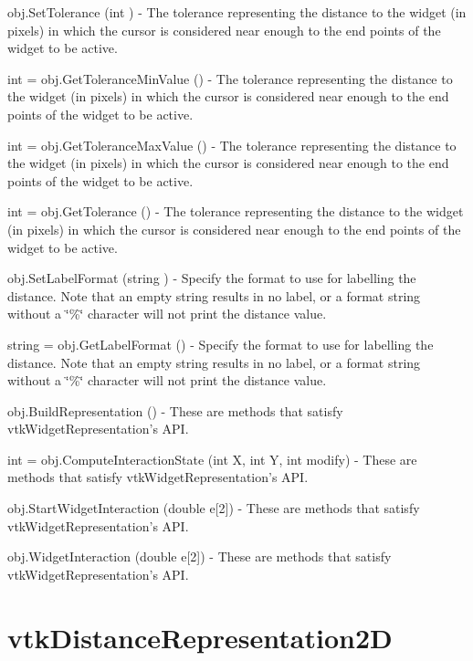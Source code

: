 \begin{DoxyItemize}
\item {\ttfamily obj.\-Set\-Tolerance (int )} -\/ The tolerance representing the distance to the widget (in pixels) in which the cursor is considered near enough to the end points of the widget to be active.  
\item {\ttfamily int = obj.\-Get\-Tolerance\-Min\-Value ()} -\/ The tolerance representing the distance to the widget (in pixels) in which the cursor is considered near enough to the end points of the widget to be active.  
\item {\ttfamily int = obj.\-Get\-Tolerance\-Max\-Value ()} -\/ The tolerance representing the distance to the widget (in pixels) in which the cursor is considered near enough to the end points of the widget to be active.  
\item {\ttfamily int = obj.\-Get\-Tolerance ()} -\/ The tolerance representing the distance to the widget (in pixels) in which the cursor is considered near enough to the end points of the widget to be active.  
\item {\ttfamily obj.\-Set\-Label\-Format (string )} -\/ Specify the format to use for labelling the distance. Note that an empty string results in no label, or a format string without a \char`\"{}\%\char`\"{} character will not print the distance value.  
\item {\ttfamily string = obj.\-Get\-Label\-Format ()} -\/ Specify the format to use for labelling the distance. Note that an empty string results in no label, or a format string without a \char`\"{}\%\char`\"{} character will not print the distance value.  
\item {\ttfamily obj.\-Build\-Representation ()} -\/ These are methods that satisfy vtk\-Widget\-Representation's A\-P\-I.  
\item {\ttfamily int = obj.\-Compute\-Interaction\-State (int X, int Y, int modify)} -\/ These are methods that satisfy vtk\-Widget\-Representation's A\-P\-I.  
\item {\ttfamily obj.\-Start\-Widget\-Interaction (double e\mbox{[}2\mbox{]})} -\/ These are methods that satisfy vtk\-Widget\-Representation's A\-P\-I.  
\item {\ttfamily obj.\-Widget\-Interaction (double e\mbox{[}2\mbox{]})} -\/ These are methods that satisfy vtk\-Widget\-Representation's A\-P\-I.  
\end{DoxyItemize}\hypertarget{vtkwidgets_vtkdistancerepresentation2d}{}\section{vtk\-Distance\-Representation2\-D}\label{vtkwidgets_vtkdistancerepresentation2d}
